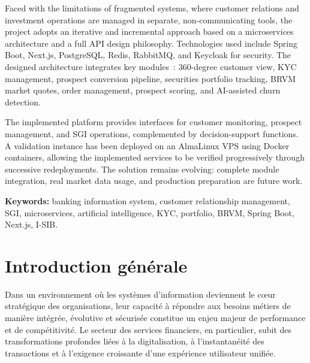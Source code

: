 \documentclass[a4paper,12pt]{report}
\begin{document}
\hspace{0.5cm}
Faced with the limitations of fragmented systems, where customer relations and
investment operations are managed in separate, non-communicating tools, the
project adopts an iterative and incremental approach based on a microservices
architecture and a full API design philosophy. Technologies used include Spring
Boot, Next.js, PostgreSQL, Redis, RabbitMQ, and Keycloak for security. The
designed architecture integrates key modules~: 360-degree customer view, KYC
management, prospect conversion pipeline, securities portfolio tracking, BRVM
market quotes, order management, prospect scoring, and AI-assisted churn
detection.

\hspace{0.5cm}
The implemented platform provides interfaces for customer monitoring, prospect
management, and SGI operations, complemented by decision-support functions. A
validation instance has been deployed on an AlmaLinux VPS using Docker
containers, allowing the implemented services to be verified progressively
through successive redeployments. The solution remains evolving: complete module
integration, real market data usage, and production preparation are future work.

\vspace{0.8cm}
\noindent
\textbf{Keywords:} banking information system, customer relationship management,
SGI, microservices, artificial intelligence, KYC, portfolio, BRVM, Spring Boot,
Next.js, I-SIB.

\cleardoublepage

\tableofcontents
\newpage

\listoffigures
{}
\newpage

\listoftables
{}
\newpage

\setcounter{page}{1}
\chapter*{Introduction générale}
{}

Dans un environnement où les systèmes d'information deviennent le cœur stratégique des organisations, leur capacité à répondre aux besoins métiers de manière intégrée, évolutive et sécurisée constitue un enjeu majeur de performance et de compétitivité. Le secteur des services financiers, en particulier, subit des transformations profondes liées à la digitalisation, à l'instantanéité des transactions et à l'exigence croissante d'une expérience utilisateur unifiée.
\end{document}
